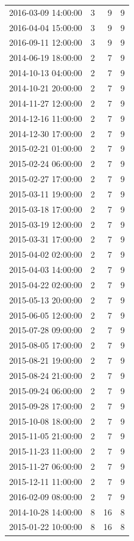 \begin{tabular}{lrrr}
2016-03-09 14:00:00 & 3 & 9 & 9 \\
2016-04-04 15:00:00 & 3 & 9 & 9 \\
2016-09-11 12:00:00 & 3 & 9 & 9 \\
2014-06-19 18:00:00 & 2 & 7 & 9 \\
2014-10-13 04:00:00 & 2 & 7 & 9 \\
2014-10-21 20:00:00 & 2 & 7 & 9 \\
2014-11-27 12:00:00 & 2 & 7 & 9 \\
2014-12-16 11:00:00 & 2 & 7 & 9 \\
2014-12-30 17:00:00 & 2 & 7 & 9 \\
2015-02-21 01:00:00 & 2 & 7 & 9 \\
2015-02-24 06:00:00 & 2 & 7 & 9 \\
2015-02-27 17:00:00 & 2 & 7 & 9 \\
2015-03-11 19:00:00 & 2 & 7 & 9 \\
2015-03-18 17:00:00 & 2 & 7 & 9 \\
2015-03-19 12:00:00 & 2 & 7 & 9 \\
2015-03-31 17:00:00 & 2 & 7 & 9 \\
2015-04-02 02:00:00 & 2 & 7 & 9 \\
2015-04-03 14:00:00 & 2 & 7 & 9 \\
2015-04-22 02:00:00 & 2 & 7 & 9 \\
2015-05-13 20:00:00 & 2 & 7 & 9 \\
2015-06-05 12:00:00 & 2 & 7 & 9 \\
2015-07-28 09:00:00 & 2 & 7 & 9 \\
2015-08-05 17:00:00 & 2 & 7 & 9 \\
2015-08-21 19:00:00 & 2 & 7 & 9 \\
2015-08-24 21:00:00 & 2 & 7 & 9 \\
2015-09-24 06:00:00 & 2 & 7 & 9 \\
2015-09-28 17:00:00 & 2 & 7 & 9 \\
2015-10-08 18:00:00 & 2 & 7 & 9 \\
2015-11-05 21:00:00 & 2 & 7 & 9 \\
2015-11-23 11:00:00 & 2 & 7 & 9 \\
2015-11-27 06:00:00 & 2 & 7 & 9 \\
2015-12-11 11:00:00 & 2 & 7 & 9 \\
2016-02-09 08:00:00 & 2 & 7 & 9 \\
2014-10-28 14:00:00 & 8 & 16 & 8 \\
2015-01-22 10:00:00 & 8 & 16 & 8 \\

\end{tabular}
